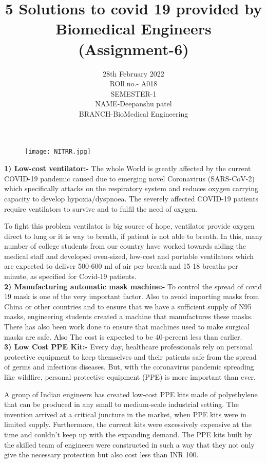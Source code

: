 \documentclass[12pt]{article}
\title{\textbf{5 Solutions to covid 19 provided by Biomedical Engineers }\\(Assignment-6)}
\date{28th February 2022\\ROll no.- A018\\SEMESTER-1\\NAME-Deepanshu patel\\BRANCH-BioMedical Engineering}
\begin{document}
\begin{figure}[h]
\centering
\texttt{[image: NITRR.jpg]}

\maketitle
\end{figure}

\clearpage

\textbf{1) Low-cost ventilator:-}
 The whole World is greatly affected by the current COVID-19 pandemic caused due to emerging novel Coronavirus (SARS-CoV-2) which specifically attacks on the respiratory system and reduces oxygen carrying capacity to develop hypoxia/dyspnoea. The severely affected COVID-19 patients require ventilators to survive and to fulfil the need of oxygen.

 To fight this problem ventilator is big source of hope, ventilator provide oxygen direct to lung or it is way to breath, if patient is not able to breath. In this, many number of college students from our country have worked towards aiding the medical staff and developed oven-sized, low-cost and portable ventilators which are expected to deliver 500-600 ml of air per breath and 15-18 breaths per minute, as specified for Covid-19 patients.\\

\textbf{2) Manufacturing automatic mask machine:-} To control the spread of covid 19 mask is one of the very important factor. Also to avoid importing masks from China or other countries and to ensure that we have a sufficient supply of N95 masks, engineering students created a machine that manufactures these masks. There has also been work done to ensure that machines used to make surgical masks are safe. Also The cost is expected to be 40-percent less than earlier.\\


\textbf{3) Low Cost PPE Kit:-} Every day, healthcare professionals rely on personal protective equipment to keep themselves and their patients safe from the spread of germs and infectious diseases. But, with the coronavirus pandemic spreading like wildfire, personal protective equipment (PPE) is more important than ever.\

 A group of Indian engineers has created low-cost PPE kits made of polyethylene that can be produced in any small to medium-scale industrial setting. The invention arrived at a critical juncture in the market, when PPE kits were in limited supply. Furthermore, the current kits were excessively expensive at the time and couldn't keep up with the expanding demand. The PPE kits built by the skilled team of engineers were constructed in such a way that they not only give the necessary protection but also cost less than INR 100.\\
\end{document}
